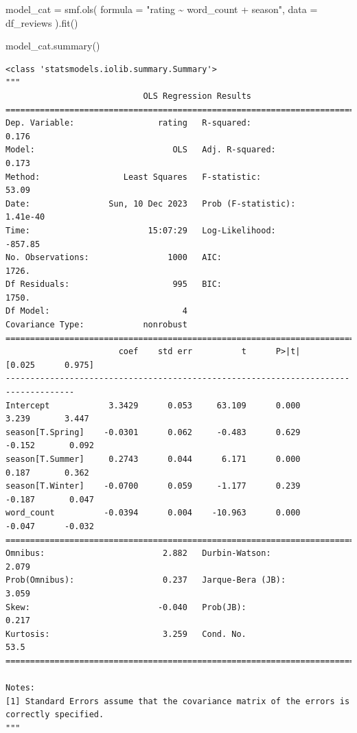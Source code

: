 \documentclass[
  letterpaper,
]{krantz}
\newenvironment{Shaded}{}{}
\newcommand{\NormalTok}[1]{#1}
\newcommand{\OperatorTok}[1]{\textcolor[rgb]{0.40,0.40,0.40}{#1}}
\newcommand{\StringTok}[1]{\textcolor[rgb]{0.25,0.44,0.63}{#1}}
\begin{document}
\begin{Shaded}
\begin{Highlighting}[]
\NormalTok{model\_cat }\OperatorTok{=}\NormalTok{ smf.ols(}
\NormalTok{    formula }\OperatorTok{=} \StringTok{"rating \textasciitilde{} word\_count + season"}\NormalTok{,}
\NormalTok{    data }\OperatorTok{=}\NormalTok{ df\_reviews}
\NormalTok{).fit()}

\NormalTok{model\_cat.summary()}
\end{Highlighting}
\end{Shaded}

\begin{verbatim}
<class 'statsmodels.iolib.summary.Summary'>
"""
                            OLS Regression Results                            
==============================================================================
Dep. Variable:                 rating   R-squared:                       0.176
Model:                            OLS   Adj. R-squared:                  0.173
Method:                 Least Squares   F-statistic:                     53.09
Date:                Sun, 10 Dec 2023   Prob (F-statistic):           1.41e-40
Time:                        15:07:29   Log-Likelihood:                -857.85
No. Observations:                1000   AIC:                             1726.
Df Residuals:                     995   BIC:                             1750.
Df Model:                           4                                         
Covariance Type:            nonrobust                                         
====================================================================================
                       coef    std err          t      P>|t|      [0.025      0.975]
------------------------------------------------------------------------------------
Intercept            3.3429      0.053     63.109      0.000       3.239       3.447
season[T.Spring]    -0.0301      0.062     -0.483      0.629      -0.152       0.092
season[T.Summer]     0.2743      0.044      6.171      0.000       0.187       0.362
season[T.Winter]    -0.0700      0.059     -1.177      0.239      -0.187       0.047
word_count          -0.0394      0.004    -10.963      0.000      -0.047      -0.032
==============================================================================
Omnibus:                        2.882   Durbin-Watson:                   2.079
Prob(Omnibus):                  0.237   Jarque-Bera (JB):                3.059
Skew:                          -0.040   Prob(JB):                        0.217
Kurtosis:                       3.259   Cond. No.                         53.5
==============================================================================

Notes:
[1] Standard Errors assume that the covariance matrix of the errors is correctly specified.
"""
\end{verbatim}
\end{document}
